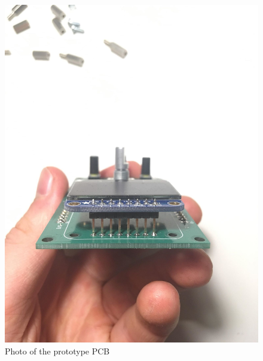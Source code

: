 \documentclass{article}
\begin{document}
  \begin{figure}[H]
  	\centering
  	\includegraphics[width=1\linewidth]{IMG_2390.jpg}
  	\caption{Photo of the prototype PCB}
 	 \label{fig: pcb22t}
\end{figure}
\end{document}
